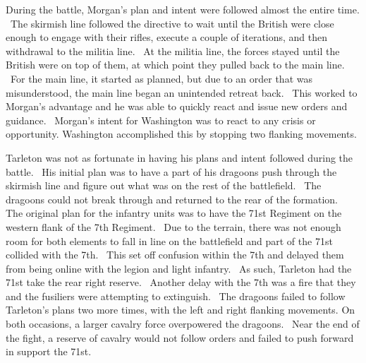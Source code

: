 During the battle, Morgan’s plan and intent were followed almost the entire
time.  The skirmish line followed the directive to wait until the British were
close enough to engage with their rifles, execute a couple of iterations, and
then withdrawal to the militia line.  At the militia line, the forces stayed
until the British were on top of them, at which point they pulled back to the
main line.  For the main line, it started as planned, but due to an order that
was misunderstood, the main line began an unintended retreat back.  This worked
to Morgan’s advantage and he was able to quickly react and issue new orders and
guidance.  Morgan’s intent for Washington was to react to any crisis or
opportunity.  Washington accomplished this by stopping two flanking movements.

Tarleton was not as fortunate in having his plans and intent followed
during the battle.  His initial plan was to have a part of his dragoons push
through the skirmish line and figure out what was on the rest of the
battlefield.  The dragoons could not break through and returned to the rear of
the formation.   The original plan for the infantry units was to have the 71st
Regiment on the western flank of the 7th Regiment.  Due to the terrain, there
was not enough room for both elements to fall in line on the battlefield and
part of the 71st collided with the 7th.  This set off confusion within the 7th
and delayed them from being online with the legion and light infantry.  As such,
Tarleton had the 71st take the rear right reserve.  Another delay with the 7th
was a fire that they and the fusiliers were attempting to extinguish.  The
dragoons failed to follow Tarleton’s plans two more times, with the left and
right flanking movements.  On both occasions, a larger cavalry force overpowered
the dragoons.  Near the end of the fight, a reserve of cavalry would not follow
orders and failed to push forward in support the 71st. 
